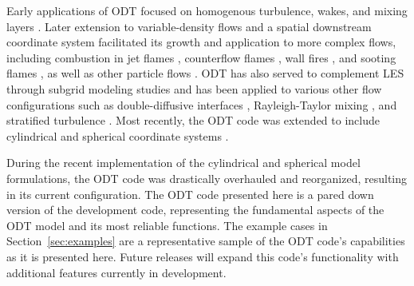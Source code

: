 \documentclass[preprint,12pt, a4paper]{elsarticle}
\begin{document}
Early applications of ODT focused on homogenous turbulence, wakes, and mixing layers \cite{Kerstein_1999,Kerstein_2000,Kerstein_2001}. Later extension to variable-density flows and a spatial downstream coordinate system facilitated its growth and application to more complex flows, including combustion in jet flames \cite{Echekki_2001,Hewson_2001,Hewson_2002,Lignell_2012,Punati_2011,Abdelsamie_2017,Lignell_2017, Goshayeshi_2015}, counterflow flames \cite{Jozefik_2015}, wall fires \cite{Monson_2016}, and sooting flames \cite{Lignell_2015,Hewson_2006,Hewson_2009,Lignell_2015b,Ricks_2010}, as well as other particle flows \cite{Sun_2017,Schmidt_2009,Sun_2014,Fistler_2017}. ODT has also served to complement LES through subgrid modeling studies \cite{Cao_2008,Schmidt_2003,Schmidt_2010} and has been applied to various other flow configurations such as double-diffusive interfaces \cite{GonzalezJuez_2011}, Rayleigh-Taylor mixing \cite{GonzalezJuez_2013}, and stratified turbulence \cite{Wunsch_2001}. Most recently, the ODT code was extended to include cylindrical and spherical coordinate systems \cite{Lignell_2018,Klein_2018,Klein_2019}.

During the recent implementation of the cylindrical and spherical model formulations, the ODT code was drastically overhauled and reorganized, resulting in its current configuration. The ODT code presented here is a pared down version of the development code, representing the fundamental aspects of the ODT model and its most reliable functions. The example cases in Section~\ref{sec:examples} are a representative sample of the ODT code's capabilities as it is presented here. Future releases will expand this code's functionality with additional features currently in development. 

\end{document}
